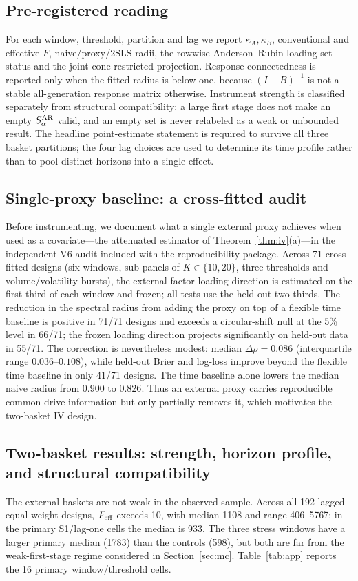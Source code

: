 \documentclass[12pt]{article}
\theoremstyle{plain}\newtheorem{theorem}{Theorem}[section]\newtheorem{proposition}[theorem]{Proposition}\newtheorem{lemma}[theorem]{Lemma}\newtheorem{corollary}[theorem]{Corollary}
\theoremstyle{definition}\newtheorem{definition}[theorem]{Definition}\newtheorem{assumption}[theorem]{Assumption}\newtheorem{remark}[theorem]{Remark}
\begin{document}
\subsection{Pre-registered reading}
For each window, threshold, partition and lag we report $\kappa_A,\kappa_B$, conventional and effective $F$, naive/proxy/2SLS radii, the rowwise Anderson--Rubin loading-set status and the joint cone-restricted projection. Response connectedness is reported only when the fitted radius is below one, because $(I-B)^{-1}$ is not a stable all-generation response matrix otherwise. Instrument strength is classified separately from structural compatibility: a large first stage does not make an empty $S^{\rm AR}_\alpha$ valid, and an empty set is never relabeled as a weak or unbounded result. The headline point-estimate statement is required to survive all three basket partitions; the four lag choices are used to determine its time profile rather than to pool distinct horizons into a single effect.

\subsection{Single-proxy baseline: a cross-fitted audit}
Before instrumenting, we document what a single external proxy achieves when used as a covariate---the attenuated estimator of Theorem~\ref{thm:iv}(a)---in the independent V6 audit included with the reproducibility package. Across 71 cross-fitted designs (six windows, sub-panels of $K\in\{10,20\}$, three thresholds and volume/volatility bursts), the external-factor loading direction is estimated on the first third of each window and frozen; all tests use the held-out two thirds. The reduction in the spectral radius from adding the proxy on top of a flexible time baseline is positive in 71/71 designs and exceeds a circular-shift null at the 5\% level in 66/71; the frozen loading direction projects significantly on held-out data in 55/71. The correction is nevertheless modest: median $\Delta\rho=0.086$ (interquartile range $0.036$--$0.108$), while held-out Brier and log-loss improve beyond the flexible time baseline in only 41/71 designs. The time baseline alone lowers the median naive radius from $0.900$ to $0.826$. Thus an external proxy carries reproducible common-drive information but only partially removes it, which motivates the two-basket IV design.

\subsection{Two-basket results: strength, horizon profile, and structural compatibility}
The external baskets are not weak in the observed sample. Across all 192 lagged equal-weight designs, $F_{\rm eff}$ exceeds 10, with median 1108 and range 406--5767; in the primary S1/lag-one cells the median is 933. The three stress windows have a larger primary median (1783) than the controls (598), but both are far from the weak-first-stage regime considered in Section~\ref{sec:mc}. Table~\ref{tab:app} reports the 16 primary window/threshold cells.
\end{document}
